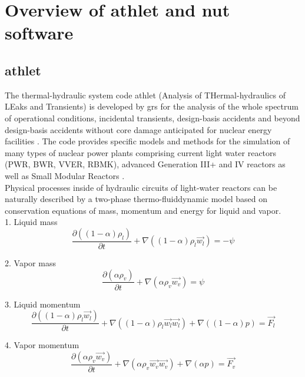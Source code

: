 \chapter{Overview of \gls{athlet} and \gls{nut} software}\label{chapter:athlet-nut}

\section{\gls{athlet}}
\label{sec:athlet-overview}


The thermal-hydraulic system code \gls{athlet} (Analysis of THermal-hydraulics of LEaks and Transients) is developed by \gls{grs} for the analysis of the whole spectrum of operational conditions, incidental transients, design-basis accidents and beyond design-basis accidents without core damage anticipated for nuclear energy facilities \cite{grs:athlet-info}. The code provides specific models and methods for the simulation of many types of nuclear power plants comprising current light water reactors (PWR, BWR, VVER, RBMK), advanced Generation III+ and IV reactors as well as Small Modular Reactors \cite{grs:athlet-info}.\\


Physical processes inside of hydraulic circuits of light-water reactors can be naturally described by a two-phase thermo-fluiddynamic model based on conservation equations of mass, momentum and energy for liquid and vapor.\\

1. Liquid mass
\begin{equation} \label{eq:athlet-1}
\frac{\partial ((1-\alpha)\rho_{l})}{\partial t} + \nabla ((1-\alpha) \rho_{l} \vec{w_{l}}) = - \psi
\end{equation}


2. Vapor mass
\begin{equation} \label{eq:athlet-2}
\frac{\partial (\alpha \rho_{v})}{\partial t} + \nabla (\alpha \rho_{v} \vec{w_{v}}) = \psi
\end{equation}


3. Liquid momentum
\begin{equation} \label{eq:athlet-3}
\frac{\partial ((1-\alpha) \rho_{l} \vec{w_{l}})}{\partial t} + \nabla ((1-\alpha) \rho_{l} \vec{w_{l}} \vec{w_{l}}) + \nabla ((1 - \alpha)p) = \vec{F_{l}}
\end{equation}


4. Vapor momentum
\begin{equation} \label{eq:athlet-4}
\frac{\partial (\alpha \rho_{v} \vec{w_{v}})}{\partial t} + \nabla (\alpha \rho_{v} \vec{w_{v}} \vec{w_{v}}) + \nabla (\alpha p) = \vec{F_{v}}
\end{equation}


